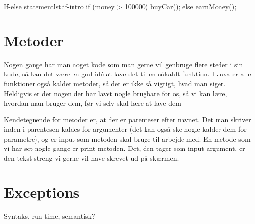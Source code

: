 \begin{JavaCode}{If-else statement}{lst:if-intro}
	if (money > 100000) {
		buyCar();
	} else {
		earnMoney();
	}
\end{JavaCode}

\section{Metoder}
Nogen gange har man noget kode som man gerne vil genbruge flere steder i sin kode, så kan det være en god idé at lave det til en såkaldt funktion. I Java er alle funktioner også kaldet metoder, så det er ikke så vigtigt, hvad man siger. Heldigvis er der nogen der har lavet nogle brugbare for os, så vi kan lære, hvordan man bruger dem, før vi selv skal lære at lave dem. 

Kendetegnende for metoder er, at der er parenteser efter navnet. Det man skriver inden i parentesen kaldes for argumenter (det kan også ske nogle kalder dem for parametre), og er input som metoden skal bruge til arbejde med. En metode som vi har set nogle gange er print-metoden. Det, den tager som input-argument, er den tekst-streng vi gerne vil have skrevet ud på skærmen.

\section{Exceptions}
Syntaks, run-time, semantisk?


%
%
%
%
%
%
%
%
